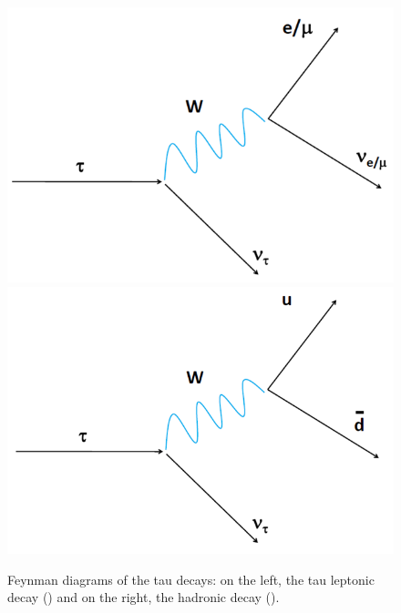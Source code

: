 


 
\begin{center}
\begin{figure}[ht]
\centering
\includegraphics[scale=0.6]{figuras/Chapter1/leptondecay.png}
\includegraphics[scale=0.5]{figuras/Chapter1/hadrondecay.png}
\caption{Feynman diagrams of the tau decays: on the left, the tau leptonic decay (\tauell) and on the right,
the hadronic decay (\tauh).
} \label{taudecays}
\end{figure}
\end{center}

